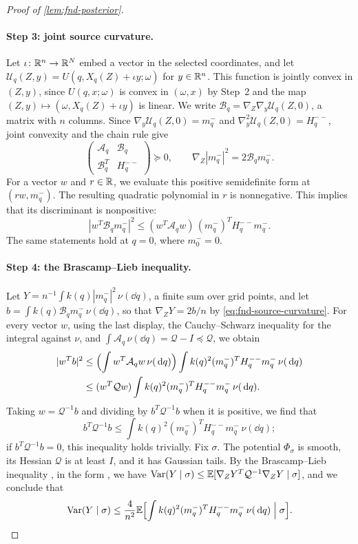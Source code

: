 \begin{proof}[Proof of \cref{lem:fnd-posterior}]
\paragraph{Step 3: joint source curvature.}
Let $\iota\colon\mathbb R^n\to\mathbb R^N$ embed a vector in the selected coordinates,
and let $\mathcal U_q(Z,y)=U(q,X_q(Z)+\iota y;\omega)$ for
$y\in\mathbb R^n$. This function is jointly convex in $(Z,y)$, since $U(q,x;\omega)$ is
convex in $(\omega,x)$ by Step~2 and the map
$(Z,y)\mapsto(\omega,X_q(Z)+\iota y)$ is linear. We write
$\mathcal B_q=\nabla_Z\nabla_y\mathcal U_q(Z,0)$, a matrix with $n$
columns. Since $\nabla_y\mathcal U_q(Z,0)=m_q^-$ and
$\nabla_y^2\mathcal U_q(Z,0)=H_q^{--}$, joint convexity and the chain
rule give
\begin{equation}\label{eq:fnd-source-curvature}
 \begin{pmatrix}
  \mathcal A_q&\mathcal B_q\\
  \mathcal B_q^T&H_q^{--}
 \end{pmatrix}\succeq0,\qquad
 \nabla_Z|m_q^-|^2=2\mathcal B_qm_q^- .
\end{equation}
For a vector $w$ and $r\in\mathbb R$, we evaluate this positive semidefinite
form at $(rw,m_q^-)$. The resulting quadratic polynomial in $r$ is
nonnegative. This implies that its discriminant is nonpositive:
\[
 |w^T\mathcal B_qm_q^-|^2
 \le(w^T\mathcal A_qw)\,(m_q^-)^TH_q^{--}m_q^- .
\]
The same statements hold at $q=0$, where $m_0^-=0$.

\paragraph{Step 4: the Brascamp--Lieb inequality.}
Let $Y=n^{-1}\int k(q)|m_q^-|^2\,\nu(\dd q)$, a finite sum over grid
points, and let $b=\int k(q)\mathcal B_qm_q^-\,\nu(\dd q)$, so that
$\nabla_ZY=2b/n$ by \eqref{eq:fnd-source-curvature}. For every vector $w$,
using the last display, the Cauchy--Schwarz
inequality for the integral against $\nu$, and
$\int\mathcal A_q\,\nu(\dd q)=\mathcal Q-I\preceq\mathcal Q$, we obtain
\[
 \begin{aligned}
 |w^Tb|^2&\le\Bigl(\int w^T\mathcal A_qw\,\nu(\,\mathrm d q)\Bigr)
             \int k(q)^2(m_q^-)^TH_q^{--}m_q^-\,\nu(\,\mathrm d q)\\
 &\le(w^T\mathcal Qw)\int k(q)^2(m_q^-)^TH_q^{--}m_q^-\,\nu(\,\mathrm d q).
 \end{aligned}
\]
Taking $w=\mathcal Q^{-1}b$ and dividing by $b^T\mathcal Q^{-1}b$ when it is
positive, we find that
\[
 b^T\mathcal Q^{-1}b\le\int k(q)^2(m_q^-)^TH_q^{--}m_q^-\,\nu(\dd q);
\]
if $b^T\mathcal Q^{-1}b=0$, this inequality holds trivially. Fix $\sigma$. The
potential $\Phi_\sigma$ is smooth, its Hessian $\mathcal Q$ is at least
$I$, and it has Gaussian tails. By the Brascamp--Lieb inequality
\cite{BrascampLieb1976}, in the form
\cite[Proposition~2.2, (2.14)]{AL}, we have
$\operatorname{Var}(Y\mid\sigma)\le\mathbb E[\nabla_ZY^T\mathcal Q^{-1}\nabla_ZY\mid\sigma]$,
and we conclude that
\[
 \operatorname{Var}(Y\mid\sigma)\le\frac4{n^2}
   \mathbb E\Bigl[\int k(q)^2(m_q^-)^TH_q^{--}m_q^-\,\nu(\,\mathrm d q)\Bigm|\sigma\Bigr].
\]


\end{proof}
